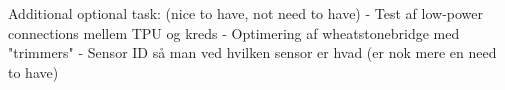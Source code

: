 Additional optional task: (nice to have, not need to have)
- Test af low-power connections mellem TPU og kreds
- Optimering af wheatstonebridge med "trimmers"
- Sensor ID så man ved hvilken sensor er hvad (er nok mere en need to have)